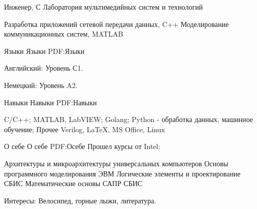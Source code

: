 \documentclass[a4paper, MMyyyy,nonstopmode]{simpleresumecv}
\begin{document}
\begin{Body}
\Gap
\BulletItem
Инженер,
\hfill
С 
\newline
Лаборатория мультимедийных систем и технологий
\begin{Detail}
\SubBulletItem
Разработка приложений сетевой передачи данных, C++
\SubBulletItem
Моделирование коммуникационных систем, MATLAB
\end{Detail}


\Section
{Языки}
{Языки}
{PDF:Языки}

\BulletItem
Английский: Уровень С1.

\Gap
\BulletItem
Немецкий: Уровень A2.


\Section
{Навыки}
{Навыки}
{PDF:Навыки}

\BulletItem
C/C++;
\Gap
\BulletItem
MATLAB, LabVIEW;
\Gap
\BulletItem
Golang;
\Gap
\BulletItem
Python - обработка данных, машинное обучение;
\Gap
\BulletItem
Прочее
\SubBulletItem
Verilog,
\SubBulletItem
{\LaTeX},
\SubBulletItem
MS Office,
\SubBulletItem
Linux


\Section
{О себе}
{О себе}
{PDF:Осебе}
\BulletItem
Прошел курсы от Intel:
\begin{Detail}
\SubBulletItem
Архитектуры и микроархитектуры универсальных компьютеров
\SubBulletItem
Основы программного моделирования ЭВМ
\SubBulletItem
Логические элементы и проектирование СБИС
\SubBulletItem
Математические основы САПР СБИС
\end{Detail}
\Gap
\BulletItem
Интересы:
Велосипед, 
горные лыжи,
литература.






\end{Body}
\end{document}
